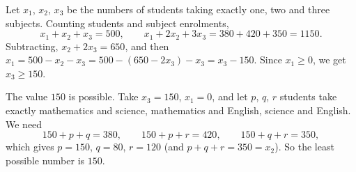 Let $x_1$, $x_2$, $x_3$ be the numbers of students taking exactly one, two and three subjects. Counting students and subject enrolments,
\[x_1+x_2+x_3=500,\qquad x_1+2x_2+3x_3=380+420+350=1150 .\]
Subtracting, $x_2+2x_3=650$, and then $x_1=500-x_2-x_3=500-(650-2x_3)-x_3=x_3-150$. Since $x_1\ge0$, we get $x_3\ge150$.

The value $150$ is possible. Take $x_3=150$, $x_1=0$, and let $p$, $q$, $r$ students take exactly mathematics and science, mathematics and English, science and English. We need
\[150+p+q=380,\qquad150+p+r=420,\qquad150+q+r=350,\]
which gives $p=150$, $q=80$, $r=120$ (and $p+q+r=350=x_2$). So the least possible number is $\boxed{150}$.
